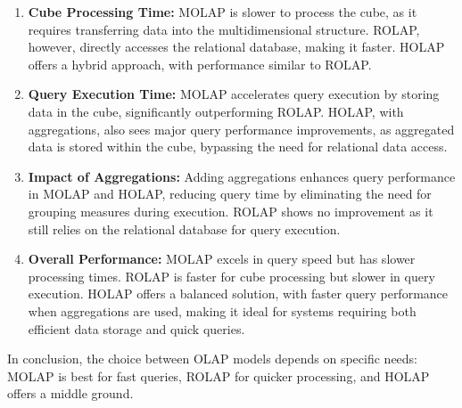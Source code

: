 \documentclass[a4paper,12pt]{article} %
\begin{document}
\begin{enumerate}
    \item \textbf{Cube Processing Time:} MOLAP is slower to process the cube, as it requires transferring data into the multidimensional structure. ROLAP, however, directly accesses the relational database, making it faster. HOLAP offers a hybrid approach, with performance similar to ROLAP.
    
    \item \textbf{Query Execution Time:} MOLAP accelerates query execution by storing data in the cube, significantly outperforming ROLAP. HOLAP, with aggregations, also sees major query performance improvements, as aggregated data is stored within the cube, bypassing the need for relational data access.
    
    \item \textbf{Impact of Aggregations:} Adding aggregations enhances query performance in MOLAP and HOLAP, reducing query time by eliminating the need for grouping measures during execution. ROLAP shows no improvement as it still relies on the relational database for query execution.
    
    \item \textbf{Overall Performance:} MOLAP excels in query speed but has slower processing times. ROLAP is faster for cube processing but slower in query execution. HOLAP offers a balanced solution, with faster query performance when aggregations are used, making it ideal for systems requiring both efficient data storage and quick queries.
\end{enumerate}

In conclusion, the choice between OLAP models depends on specific needs: MOLAP is best for fast queries, ROLAP for quicker processing, and HOLAP offers a middle ground.
\end{document}

